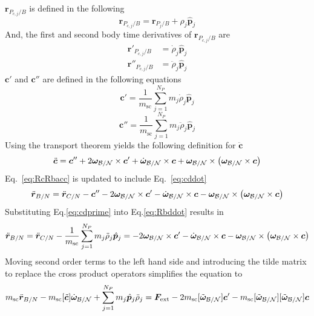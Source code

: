 $\bm{r}_{P_{c,j}/B}$ is defined in the following
\begin{equation}
	\bm{r}_{P_{c,j}/B} = \bm{r}_{P_{j}/B} + \rho_j \hat{\bm p}_j 
\end{equation}
And, the first and second body time derivatives of $\bm{r}_{P_{c,j}/B}$ are
\begin{align}
	\bm{r}'_{P_{c,j}/B} &= \dot{\rho}_j \hat{\bm p}_j 
	\\
	\bm{r}''_{P_{c,j}/B} &= \ddot{\rho}_j \hat{\bm p}_j 
\end{align}
$\bm{c}'$ and $\bm{c}''$ are defined in the following equations
\begin{equation}
	\bm{c}' = \frac{1}{m_{\text{sc}}}\sum_{j=1}^{N_{P}}m_j\dot{\rho}_j \hat{\bm p}_j
	\label{eq:cprime}
\end{equation}
\begin{equation}
	\bm{c}'' = \frac{1}{m_{\text{sc}}}\sum_{j=1}^{N_{P}}m_j\ddot{\rho}_j \hat{\bm p}_j
	\label{eq:cdprime}
\end{equation}
Using the transport theorem\cite{schaub} yields the following definition for $\ddot{\bm c}$
\begin{equation}
	\ddot{\bm c} = \bm{c}'' + 2\bm\omega_{\cal B/N}\times\bm{c}'+\dot{\bm\omega}_{\cal B/N}\times\bm{c}+\bm\omega_{\cal B/N}\times\left(\bm\omega_{\cal B/N}\times\bm{c}\right)
	\label{eq:cddot}
\end{equation}
Eq.~\eqref{eq:RcRbacc} is updated to include Eq.~\eqref{eq:cddot}
\begin{equation}
	\ddot{\bm r}_{B/N} = \ddot{\bm r}_{C/N}-\bm{c}'' - 2\bm\omega_{\cal B/N}\times\bm{c}'-\dot{\bm\omega}_{\cal B/N}\times\bm{c}-\bm\omega_{\cal B/N}\times\left(\bm\omega_{\cal B/N}\times\bm{c}\right)
	\label{eq:Rbddot}
\end{equation}
Substituting Eq.\eqref{eq:cdprime} into Eq.\eqref{eq:Rbddot} results in
\begin{equation}
	\ddot{\bm r}_{B/N} = \ddot{\bm r}_{C/N}-\frac{1}{m_{\text{sc}}}\sum_{j=1}^{N_{P}}m_j\ddot{\rho}_j \hat{\bm p}_j = 
	- 2\bm\omega_{\cal B/N}\times\bm c'
	-\dot{\bm\omega}_{\cal B/N}\times\bm{c}-\bm\omega_{\cal B/N}\times\left(\bm\omega_{\cal B/N}\times\bm{c}\right)
	\label{eq:Rbddot2}
\end{equation}
Moving second order terms to the left hand side and introducing the tilde matrix\cite{schaub} to replace the cross product operators simplifies the equation to
\begin{equation}
	m_{\text{sc}} \ddot{\bm r}_{B/N}-m_{\text{sc}} [\tilde{\bm{c}}] \dot{\bm\omega}_{\cal B/N} +\sum_{j=1}^{N_{P}}m_j \hat{\bm p}_j \ddot{\rho}_j = \bm F_{\text{ext}}	- 2 m_{\text{sc}} [\tilde{\bm\omega}_{\cal B/N}] \bm c'
	- m_{\text{sc}} [\tilde{\bm\omega}_{\cal B/N}][\tilde{\bm\omega}_{\cal B/N}]\bm{c}
	\label{eq:Rbddot3}
\end{equation}

